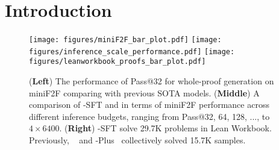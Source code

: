 \section{Introduction}

\begin{figure}[h]
    \centering
\texttt{[image: figures/miniF2F\_bar\_plot.pdf]}
\texttt{[image: figures/inference\_scale\_performance.pdf]}
\texttt{[image: figures/leanworkbook\_proofs\_bar\_plot.pdf]}
    \caption{
    (\textbf{Left}) The performance of Pass@32 for whole-proof generation on miniF2F comparing with previous SOTA models.
    (\textbf{Middle}) A comparison of \prover-SFT and \dsprover{} in terms of miniF2F performance across different inference budgets, ranging from Pass@32, 64, 128, ..., to $4 \times 6400$.
    (\textbf{Right}) \prover-SFT solve 29.7K problems in Lean Workbook. Previously,  \internlmstep~\citep{wu2024internlm2} and \internlmmath-Plus~\citep{ying2024internlm} collectively solved 15.7K samples.
    } %
    \label{fig:main_Results}
\end{figure}


